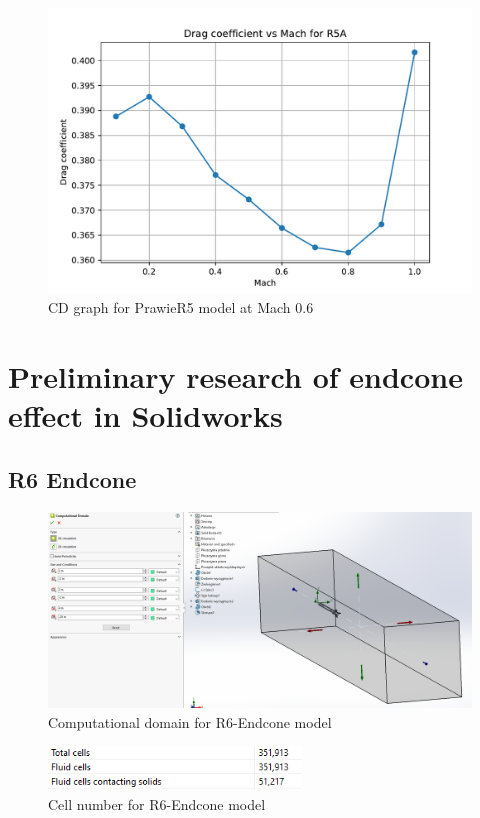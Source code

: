 \documentclass{article}
\begin{document}
\begin{figure}[H]
    \centering
    \includegraphics[width=\textwidth]{../data/PrawieR5-Solid/plotZD.pdf}
    \caption{CD graph for PrawieR5 model at Mach 0.6}
\end{figure}



\section{Preliminary research of endcone effect in Solidworks}
\subsection{R6 Endcone}
\begin{figure}[H]
    \centering
    \includegraphics[width=\textwidth]{../data/R6-Endcone-Solid/domain.png}
    \caption{Computational domain for R6-Endcone model}
\end{figure}
\begin{figure}[H]
    \centering
    \includegraphics[width=0.6\textwidth]{../data/R6-Endcone-Solid/cells.png}
    \caption{Cell number for R6-Endcone model}
\end{figure}
\end{document}
